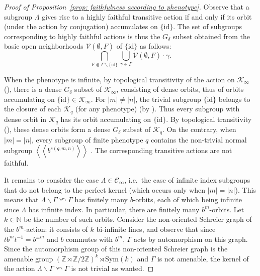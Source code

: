 \documentclass[12pt]{article}
\numberwithin{equation}{section}
\theoremstyle{definition}
\newcommand{\N}{\mathbb{N}}
\newcommand{\Z}{\mathbb{Z}}
\newcommand{\inv}{^{-1}}
\newcommand{\lala}{\left\langle\!\left\langle}
\newcommand{\rara}{\right\rangle\!\right\rangle}
\newcommand{\abs}[1]{\left\lvert #1\right\rvert}
\newcommand{\PK}{\mathcal{K}}
\def\id{\mathrm{id}}
\newcommand{\Sym}{\mathrm{Sym}}
\newcommand{\bs}{\backslash}
\begin{document}
\begin{proof} [Proof of Proposition~\ref{prop: faithfulness according to phenotype}]
Observe that a subgroup $\Lambda$ gives rise to a highly faithful transitive action if and only if its orbit (under the action by conjugation) accumulates on $\{\id\}$.
 The set of subgroups corresponding to highly faithful actions is thus the \(G_\delta\) subset obtained from the basic open neighborhoods $\mathcal{V}(\emptyset, F)$ of $\{\id\}$ as follows:
 \[\bigcap_{F\Subset \Gamma\smallsetminus \{\id\}}\bigcup_{\gamma\in \Gamma}\mathcal{V}(\emptyset, F)\cdot \gamma.\]
 


 
 
 
 
When the phenotype is infinite, by topological transitivity of the action on $\PK_\infty$ (\cite[Theorem 5.14]{CGLMS-22}), there is a dense \( G_\delta\) subset of $\PK_\infty$, consisting of  dense orbits, thus of orbits accumulating on $\{\id\}\in \PK_\infty$.
For $\abs{m}\neq \abs{n}$, the trivial subgroup  $\{\id\}$ belongs to the closure of each $\PK_q$ (for any phenotype) (by \cite[Theorem D (2)]{CGLMS-22}). 
Thus every subgroup with dense orbit in $\PK_q$ 
has its orbit accumulating on $\{\id\}$.
By topological transitivity (\cite[Theorem 5.14]{CGLMS-22}), 
these dense orbits form a dense \(G_\delta\) subset of $\PK_q$. 
On the contrary, when $\abs{m}= \abs{n}$, every subgroup of finite phenotype $q$ contains the non-trivial normal subgroup $\lala b^{s(q,m,n)}\rara$
\cite[Theorem~5.20 (3)]{CGLMS-22}. 
The corresponding transitive actions are not faithful.

It remains to consider the case $\Lambda\in\mathcal{C}_\infty$, i.e.\ the case of infinite index subgroups that do not belong to the perfect kernel (which occurs only when \(\abs{m}=\abs{n}\)). 
This means that $\Lambda\bs \Gamma\curvearrowleft \Gamma$ has finitely many $b$-orbits,
each of which being infinite since $\Lambda$ has infinite index.
In particular, there are finitely many \(b^m\)-orbits. Let $k\in\N$
be the number of such orbits. 
Consider the non-oriented Schreier graph of the \(b^m\)-action: it consists of \(k\) bi-infinite lines, and observe that 
since \(tb^mt\inv=b^{\pm m}\) and \(b\) commutes with \(b^m\), $\Gamma$
acts by automorphism on this graph.
Since the automorphism group of this non-oriented Schreier graph
is the amenable group
\((\Z\rtimes \Z/2\Z)^k\rtimes \Sym(k)\)
and \(\Gamma\) is not amenable,
the kernel of the action $\Lambda\bs \Gamma\curvearrowleft \Gamma$ is not trivial as wanted.
\end{proof}
\end{document}
